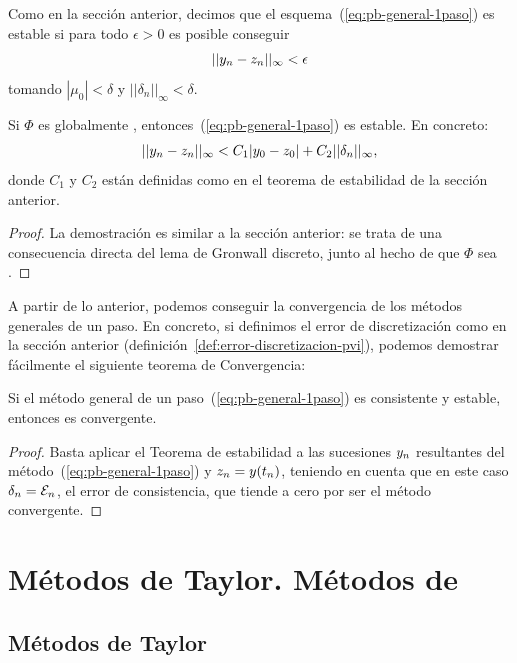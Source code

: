 Como en la sección anterior, decimos que el esquema~(\ref{eq:pb-general-1paso})
es estable si para todo $\epsilon>0$ es posible conseguir
$$
||{y_n} - z_n||_\infty < \epsilon
$$
tomando $|\mu_0|<\delta$ y $||\delta_n||_\infty<\delta$.

\begin{theorem}
  Si $\Phi$ es globalmente \lipschitz,
  entonces~(\ref{eq:pb-general-1paso}) es estable. En concreto:
  $$
  ||{y_n} - z_n||_\infty < C_1|y_0-z_0| + C_2 ||\delta_n||_\infty,
  $$
  donde $C_1$ y $C_2$ están definidas como en el teorema de
  estabilidad de la sección anterior.
\end{theorem}
\begin{proof}
  La demostración es similar a la sección anterior: se trata de una
  consecuencia directa del lema de Gronwall discreto, junto al hecho
  de que $\Phi$ sea \lipschitz.
\end{proof}
A partir de lo anterior, podemos conseguir la convergencia de los
métodos generales de un paso. En concreto, si definimos el error de
discretización como en la sección anterior
(definición~\ref{def:error-discretizacion-pvi}), podemos demostrar
fácilmente el siguiente teorema de Convergencia:

\begin{theorem}
  Si el método general de un paso~(\ref{eq:pb-general-1paso}) es
  consistente y estable, entonces es convergente.
\end{theorem}

\begin{proof}
  Basta aplicar el Teorema de estabilidad a las sucesiones ${y_n}$
  resultantes del método~(\ref{eq:pb-general-1paso}) y $z_n=y({t_n})$,
  teniendo en cuenta que en este caso $\delta_n={\cal E}_n$, el error
  de consistencia, que tiende a cero por ser el método convergente.
\end{proof}

\section{Métodos de Taylor. Métodos de \RK}

\subsection{Métodos de Taylor}
\label{sec:metodos-de-taylor}

